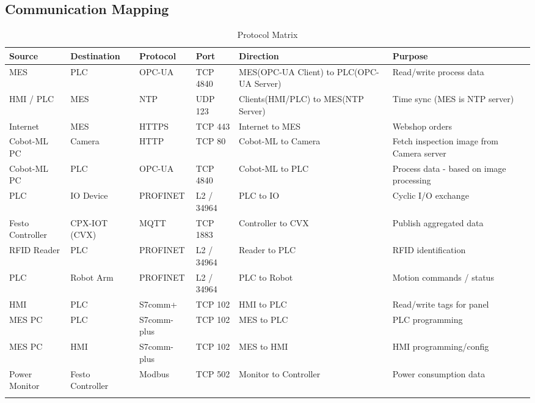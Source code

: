 \documentclass[11pt,a4paper]{article}
\begin{document}
\subsection{Communication Mapping}
{\small
\setlength{\tabcolsep}{4pt}
\begin{longtable}{L{2.6cm} L{2.0cm} L{1.8cm} L{1.8cm} L{3.4cm} L{3.2cm}}
\toprule
\textbf{Source} & \textbf{Destination} & \textbf{Protocol} & \textbf{Port} & \textbf{Direction} & \textbf{Purpose} \\
\midrule \endhead
    MES & PLC & OPC-UA & TCP 4840 & MES(OPC-UA Client) to
    PLC(OPC-UA Server) & Read/write process data \\ 

    HMI / PLC & MES & NTP & UDP 123 &
    Clients(HMI/PLC) to MES(NTP Server) & Time sync (MES is NTP server) \\

    Internet & MES & HTTPS & TCP 443 & Internet to MES &
    Webshop orders \\ 

    Cobot-ML PC & Camera & HTTP & TCP 80 & Cobot-ML to
    Camera & Fetch inspection image from Camera server \\ 

    Cobot-ML PC & PLC & OPC-UA & TCP 4840 & Cobot-ML to PLC & 
    Process data - based on image processing \\

    PLC & IO Device & PROFINET &
    L2 / 34964 & PLC to IO & Cyclic I/O exchange \\ 

    Festo Controller & CPX-IOT (CVX) & MQTT & TCP 1883 &
    Controller to CVX & Publish aggregated data \\ 

    RFID Reader & PLC & PROFINET & L2 / 34964 & Reader to PLC &
    RFID identification \\ 

    PLC & Robot Arm & PROFINET & L2 /
    34964 & PLC to Robot & Motion commands / status \\ 

    HMI & PLC & S7comm+ & TCP 102 & HMI to PLC & Read/write
    tags for panel \\ 

    MES PC & PLC & S7comm-plus & TCP 102 & MES to PLC & PLC programming \\ 

    MES PC & HMI & S7comm-plus & TCP 102 & MES to HMI & HMI
    programming/config \\ 

    Power Monitor & Festo Controller & Modbus & TCP 502
    & Monitor to Controller & Power consumption data \\
\bottomrule
    \caption{Protocol Matrix}
\end{longtable}
}
\end{document}
